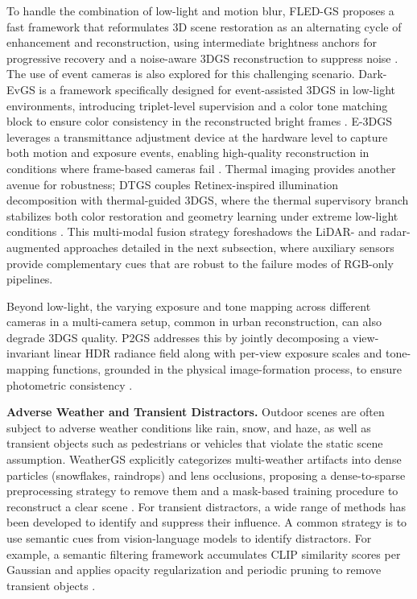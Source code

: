 \documentclass[11pt]{article}
\begin{document}
To handle the combination of low-light and motion blur, FLED-GS proposes a fast framework that reformulates 3D scene restoration as an alternating cycle of enhancement and reconstruction, using intermediate brightness anchors for progressive recovery and a noise-aware 3DGS reconstruction to suppress noise \cite{ref294}. The use of event cameras is also explored for this challenging scenario. Dark-EvGS is a framework specifically designed for event-assisted 3DGS in low-light environments, introducing triplet-level supervision and a color tone matching block to ensure color consistency in the reconstructed bright frames \cite{ref295}. E-3DGS leverages a transmittance adjustment device at the hardware level to capture both motion and exposure events, enabling high-quality reconstruction in conditions where frame-based cameras fail \cite{ref296}. Thermal imaging provides another avenue for robustness; DTGS couples Retinex-inspired illumination decomposition with thermal-guided 3DGS, where the thermal supervisory branch stabilizes both color restoration and geometry learning under extreme low-light conditions \cite{ref297}. This multi-modal fusion strategy foreshadows the LiDAR- and radar-augmented approaches detailed in the next subsection, where auxiliary sensors provide complementary cues that are robust to the failure modes of RGB-only pipelines.

Beyond low-light, the varying exposure and tone mapping across different cameras in a multi-camera setup, common in urban reconstruction, can also degrade 3DGS quality. P2GS addresses this by jointly decomposing a view-invariant linear HDR radiance field along with per-view exposure scales and tone-mapping functions, grounded in the physical image-formation process, to ensure photometric consistency \cite{ref298}.

\textbf{Adverse Weather and Transient Distractors.} Outdoor scenes are often subject to adverse weather conditions like rain, snow, and haze, as well as transient objects such as pedestrians or vehicles that violate the static scene assumption. WeatherGS explicitly categorizes multi-weather artifacts into dense particles (snowflakes, raindrops) and lens occlusions, proposing a dense-to-sparse preprocessing strategy to remove them and a mask-based training procedure to reconstruct a clear scene \cite{ref299}. For transient distractors, a wide range of methods has been developed to identify and suppress their influence. A common strategy is to use semantic cues from vision-language models to identify distractors. For example, a semantic filtering framework accumulates CLIP similarity scores per Gaussian and applies opacity regularization and periodic pruning to remove transient objects \cite{ref300}.
\end{document}
